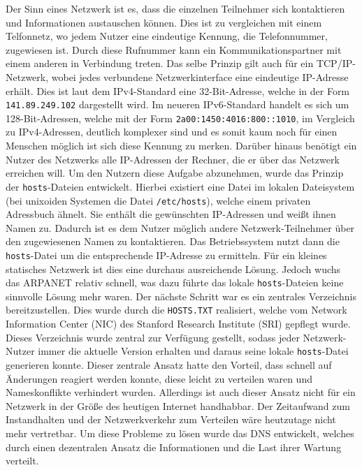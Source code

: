 \documentclass[a4paper, 12pt, BCOR10mm, DIV12, toc=bibliography, toc=listof, german]{scrbook}
\begin{document}
			Der Sinn eines Netzwerk ist es, dass die einzelnen Teilnehmer sich kontaktieren und
			Informationen austauschen können. Dies ist zu vergleichen mit einem Telfonnetz, wo jedem
			Nutzer eine eindeutige Kennung, die Telefonnummer, zugewiesen ist. Durch diese Rufnummer kann
			ein Kommunikationspartner mit einem anderen in Verbindung treten. Das selbe Prinzip gilt auch
			für ein TCP/IP-Netzwerk, wobei jedes verbundene Netzwerkinterface eine eindeutige IP-Adresse
			erhält. Dies ist laut dem IPv4-Standard \cite{rfc791} eine 32-Bit-Adresse, welche in der Form
			\texttt{141.89.249.102} dargestellt wird. Im neueren IPv6-Standard \cite{rfc2460} handelt es
			sich um 128-Bit-Adressen, welche mit der Form \texttt{2a00:1450:4016:800::1010},
			im Vergleich zu IPv4-Adressen, deutlich komplexer sind und es somit kaum noch für einen Menschen
			möglich ist sich diese Kennung zu merken. Darüber hinaus benötigt ein Nutzer des Netzwerks
			alle IP-Adressen der Rechner, die er über das Netzwerk erreichen will. Um den Nutzern diese
			Aufgabe abzunehmen, wurde das Prinzip der \texttt{hosts}-Dateien entwickelt. Hierbei existiert
			eine Datei im lokalen Dateisystem (bei unixoiden Systemen die Datei \texttt{/etc/hosts}),
			welche einem privaten Adressbuch ähnelt. Sie enthält die gewünschten IP-Adressen und weißt
			ihnen Namen zu. Dadurch ist es dem Nutzer möglich andere Netzwerk-Teilnehmer über den
			zugewiesenen Namen zu kontaktieren. Das Betriebssystem nutzt dann die \texttt{hosts}-Datei um
			die entsprechende IP-Adresse zu ermitteln. Für ein kleines statisches Netzwerk ist dies eine
			durchaus ausreichende Lösung. Jedoch wuchs das ARPANET relativ schnell, was dazu führte das
			lokale \texttt{hosts}-Dateien keine sinnvolle Lösung mehr waren. Der nächste Schritt war es
			ein zentrales Verzeichnis bereitzustellen. Dies wurde durch die \texttt{HOSTS.TXT} realisiert,
			welche vom Network Information Center (NIC) des Stanford Research Institute (SRI) gepflegt
			wurde. Dieses Verzeichnis wurde zentral zur Verfügung gestellt, sodass jeder Netzwerk-Nutzer
			immer die aktuelle Version erhalten und daraus seine lokale \texttt{hosts}-Datei generieren
			konnte.  Dieser zentrale Ansatz hatte den Vorteil, dass schnell auf Änderungen reagiert werden
			konnte, diese leicht zu verteilen waren und Nameskonflikte verhindert wurden.  Allerdings ist
			auch dieser Ansatz nicht für ein Netzwerk in der Größe des heutigen Internet handhabbar.  Der
			Zeitaufwand zum Instandhalten und der Netzwerkverkehr zum Verteilen wäre heutzutage nicht mehr
			vertretbar. Um diese Probleme zu lösen wurde das DNS \cite{rfc1034} entwickelt, welches
			durch einen dezentralen Ansatz die Informationen und die Last ihrer Wartung verteilt.
\end{document}
